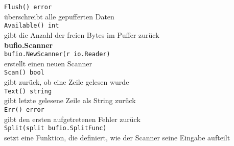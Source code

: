 \documentclass[twoside,a4paper,12pt]{article}
\begin{document}
\begin{tabbing}
 \> \verb|Flush() error| \\ 
 \> überschreibt alle gepufferten Daten \\ 
 \> \verb|Available() int| \\ 
 \> gibt die Anzahl der freien Bytes im Puffer zurück \\ 
 \> \textbf{bufio.Scanner} \\ 
 \> \verb|bufio.NewScanner(r io.Reader)| \\ 
 \> erstellt einen neuen Scanner \\ 
 \> \verb|Scan() bool| \\ 
 \> gibt zurück, ob eine Zeile gelesen wurde \\ 
 \> \verb|Text() string| \\ 
 \> gibt letzte gelesene Zeile als String zurück \\ 
 \> \verb|Err() error| \\ 
 \> gibt den ersten aufgetretenen Fehler zurück \\ 
 \> \verb|Split(split bufio.SplitFunc)| \\ 
 \> setzt eine Funktion, die definiert, wie der Scanner seine Eingabe aufteilt \\ 
\end{tabbing}
\end{document}
